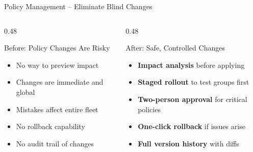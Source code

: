 \begin{frame}{Policy Management -- Eliminate Blind Changes}
  \begin{columns}[T]
    \begin{column}{0.48\textwidth}
      \begin{alertblock}{Before: Policy Changes Are Risky}
        \scriptsize
        \begin{itemize}
          \item No way to preview impact
          \item Changes are immediate and global
          \item Mistakes affect entire fleet
          \item No rollback capability
          \item No audit trail of changes
        \end{itemize}
      \end{alertblock}
    \end{column}
    \begin{column}{0.48\textwidth}
      \begin{exampleblock}{After: Safe, Controlled Changes}
        \scriptsize
        \begin{itemize}
          \item \textbf{Impact analysis} before applying
          \item \textbf{Staged rollout} to test groups first
          \item \textbf{Two-person approval} for critical policies
          \item \textbf{One-click rollback} if issues arise
          \item \textbf{Full version history} with diffs
        \end{itemize}
      \end{exampleblock}
    \end{column}
  \end{columns}

  \vspace{0.3cm}

  \begin{center}
\end{center}
\end{frame}
